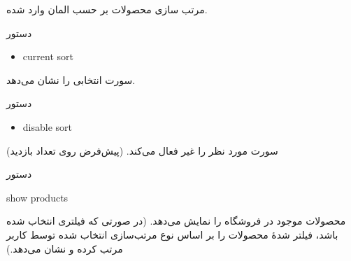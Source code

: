 \documentclass[]{article}
\begin{document}
مرتب سازی محصولات بر حسب المان وارد شده.




\begin{mybox}[colback=brilliantlavender]{دستور}

\begin{latin}

\begin{itemize}[label = {$\Rightarrow$}]

\item
current sort

\end{itemize}

\end{latin}

\end{mybox}


سورت‌ انتخابی را نشان می‌دهد.


\begin{mybox}[colback=brilliantlavender]{دستور}

\begin{latin}

\begin{itemize}[label = {$\Rightarrow$}]

\item
disable sort

\end{itemize}

\end{latin}

\end{mybox}

سورت مورد نظر را غیر فعال می‌کند. (پیش‌فرض روی تعداد بازدید)

\hrulefill

\newpage

\begin{mybox}[colback=yellow]{دستور}

\begin{latin}

show products

\end{latin}

\end{mybox}

محصولات موجود در فروشگاه را نمایش می‌دهد. (در صورتی که فیلتری انتخاب شده باشد، فیلتر شدهٔ محصولات را بر اساس نوع مرتب‌سازی انتخاب شده توسط کاربر مرتب کرده و نشان می‌دهد.‌)

\hrulefill
\end{document}
